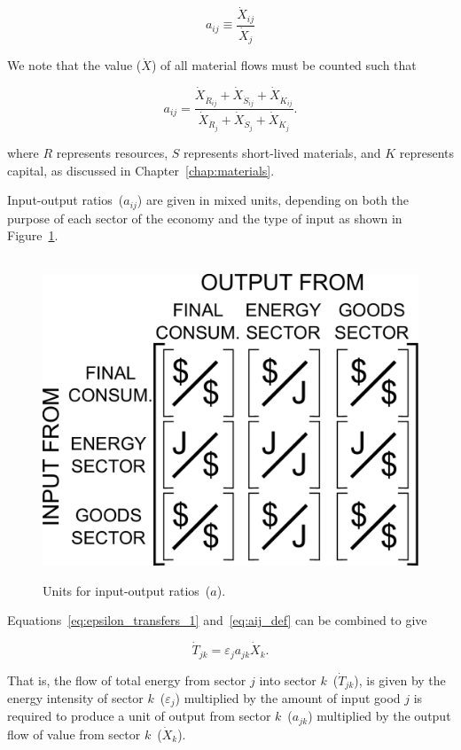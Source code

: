 \begin{equation} \label{eq:aij_def}
	a_{ij} \equiv \frac{\dot{X}_{ij}}{\dot{X}_{j}}
\end{equation}

We note that the value ($\dot{X}$) of all material flows must be counted such that

\begin{equation} \label{eq:aij_def_expanded}
	a_{ij} =	 
	\frac{\dot{X}_{\dot{R}_{ij}} + \dot{X}_{\dot{S}_{ij}} + \dot{X}_{\dot{K}_{ij}}}
		{\dot{X}_{\dot{R}_{j}} + \dot{X}_{\dot{S}_{j}} + \dot{X}_{\dot{K}_{j}}}.
\end{equation}

\noindent{}where $R$ represents resources,
$S$ represents short-lived materials, and
$K$ represents capital,
as discussed in Chapter~\ref{chap:materials}.

Input-output ratios~($a_{ij}$) are given in mixed units, 
depending on both the purpose of each sector of the economy 
and the type of input as shown in Figure~\ref{fig:A_matrix_units}.

\begin{figure}[ht!]
\centering\
\includegraphics[width=0.4\linewidth]{Part_2/Chapter_Intensity/images/I-O_units.pdf}
\caption[Units for input-output ratios]{Units for input-output 
ratios~($a$).}
\label{fig:A_matrix_units}
\end{figure}

Equations~\ref{eq:epsilon_transfers_1} and~\ref{eq:aij_def} can be combined to give

\begin{equation}
	\dot{T}_{jk} = \varepsilon_{j} a_{jk} \dot{X}_{k}.
\end{equation}

\noindent{}That is,
the flow of total energy from sector $j$ into sector $k$~($\dot{T}_{jk}$),
is given by the energy intensity of sector $k$~($\varepsilon_{j}$)
multiplied by the amount of input good $j$ is required 
to produce a unit of output from sector $k$~($a_{jk}$)
multiplied by the output flow of value from sector $k$~($\dot{X}_{k}$).

